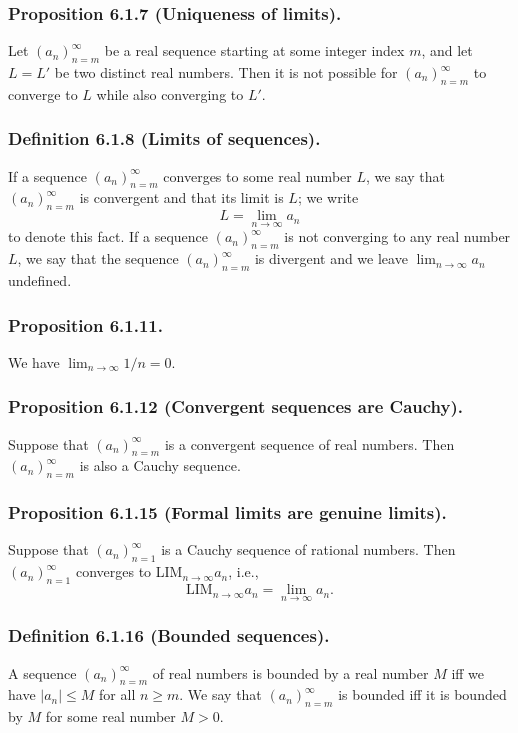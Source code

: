 \documentclass[12pt, letter]{article}
\begin{document}
\subsubsection*{Proposition 6.1.7 (Uniqueness of limits).}
Let $(a_n)_{n=m}^\infty$ be a real sequence starting at some integer index $m$, and let $L=L'$ be two distinct real numbers. Then it is not possible for $(a_n)_{n=m}^\infty$
to converge to $L$ while also converging to $L'$.
\subsubsection*{Definition 6.1.8 (Limits of sequences).}
If a sequence $(a_n)_{n=m}^\infty$ converges to some real number $L$, we say that $(a_n)_{n=m}^\infty$ is convergent and that its limit is $L$; we write
\begin{equation*}
    L=\lim_{n\to\infty}a_n
\end{equation*}
to denote this fact. If a sequence $(a_n)_{n=m}^\infty$ is not converging to any real number $L$, we say that the sequence $(a_n)_{n=m}^\infty$ is divergent 
and we leave $\lim_{n\to\infty}a_n$ undefined.
\subsubsection*{Proposition 6.1.11.}
We have $\lim_{n\to\infty}1/n=0$.
\subsubsection*{Proposition 6.1.12 (Convergent sequences are Cauchy).}
Suppose that $(a_n)_{n=m}^\infty$ is a convergent sequence of real numbers. Then $(a_n)_{n=m}^\infty$ is also a Cauchy sequence.
\subsubsection*{Proposition 6.1.15 (Formal limits are genuine limits).}
Suppose that $(a_n)_{n=1}^\infty$ is a Cauchy sequence of rational numbers. Then $(a_n)_{n=1}^\infty$ converges to LIM$_{n\to\infty}a_n$, i.e.,
\begin{equation*}
    \text{LIM}_{n\to\infty}a_n=\lim_{n\to\infty}a_n. 
\end{equation*}
\subsubsection*{Definition 6.1.16 (Bounded sequences).}
A sequence $(a_n)_{n=m}^\infty$ of real numbers is bounded by a real number $M$ iff we have $|a_n|\leq M$ for all $n\geq m$. We say that $(a_n)_{n=m}^\infty$ is bounded 
iff it is bounded by $M$ for some real number $M>0$.
\end{document}
